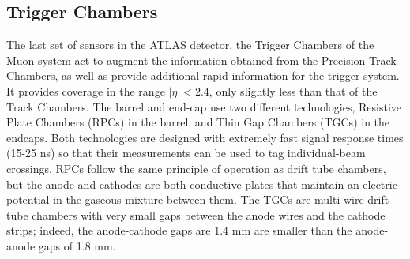     \subsection{Trigger Chambers}\label{sec:muon-trigger_chamber}
        The last set of sensors in the ATLAS detector, the Trigger Chambers of the Muon system act to augment the information obtained from the Precision Track Chambers, as well as provide additional rapid information for the trigger system.
        It provides coverage in the range $|\eta| < 2.4$, only slightly less than that of the Track Chambers.
        The barrel and end-cap use two different technologies, Resistive Plate Chambers (RPCs) in the barrel, and Thin Gap Chambers (TGCs) in the endcaps.
        Both technologies are designed with extremely fast signal response times (15-25 ns) so that their measurements can be used to tag individual-beam crossings.
        RPCs follow the same principle of operation as drift tube chambers, but the anode and cathodes are both conductive plates that maintain an electric potential in the gaseous mixture between them.
        The TGCs are multi-wire drift tube chambers with very small gaps between the anode wires and the cathode strips; indeed, the anode-cathode gaps are 1.4 mm are smaller than the anode-anode gaps of 1.8 mm.

    
